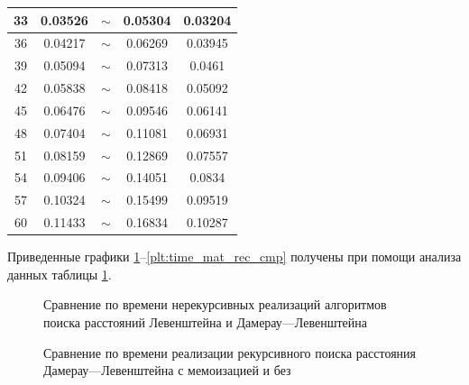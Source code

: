 \begin{table}[!ht]
\begin{tabular}{|c|c|c|c|c|}
	33 & 0.03526            & $\sim$                & 0.05304                     & 0.03204                \\ \hline
	36 & 0.04217            & $\sim$                & 0.06269                     & 0.03945                \\ \hline
	39 & 0.05094            & $\sim$                & 0.07313                     & 0.0461                 \\ \hline
	42 & 0.05838            & $\sim$                & 0.08418                     & 0.05092                \\ \hline
	45 & 0.06476            & $\sim$                & 0.09546                     & 0.06141                \\ \hline
	48 & 0.07404            & $\sim$                & 0.11081                     & 0.06931                \\ \hline
	51 & 0.08159            & $\sim$                & 0.12869                     & 0.07557                \\ \hline
	54 & 0.09406            & $\sim$                & 0.14051                     & 0.0834                 \\ \hline
	57 & 0.10324            & $\sim$                & 0.15499                     & 0.09519                \\ \hline
	60 & 0.11433            & $\sim$                & 0.16834                     & 0.10287                \\ \hline
	\end{tabular}
	\label{t:timings}
\end{table}


 Приведенные  графики \ref{plt:time_matrix_cmp}--\ref{plt:time_mat_rec_cmp}  получены при 
помощи анализа данных таблицы \ref{t:timings}.

\begin{figure}[H]
	\centering
	
	\caption{Сравнение по времени нерекурсивных реализаций алгоритмов поиска расстояний Левенштейна и Дамерау---Левенштейна}
	\label{plt:time_matrix_cmp}
\end{figure}




\begin{figure}[H]
	\centering
	
	\caption{Сравнение по времени реализации рекурсивного поиска расстояния Дамерау---Левенштейна с мемоизацией и без}
	\label{plt:time_rec_cmp}
\end{figure}


